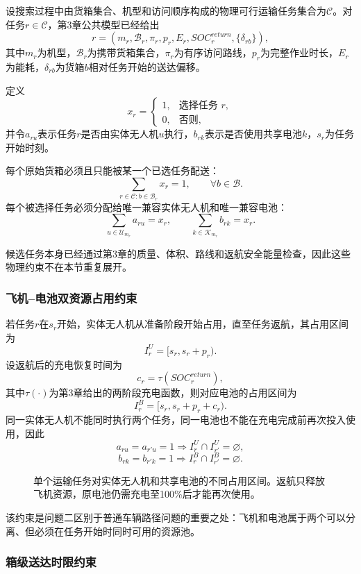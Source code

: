 \documentclass[UTF8,a4paper,12pt]{ctexart}
\begin{document}
设搜索过程中由货箱集合、机型和访问顺序构成的物理可行运输任务集合为$\mathcal C$。对任务$r\in\mathcal C$，第3章公共模型已经给出
\[
r=(m_r,\mathcal B_r,\pi_r,p_r,E_r,SOC_r^{return},\{\delta_{rb}\}),
\]
其中$m_r$为机型，$\mathcal B_r$为携带货箱集合，$\pi_r$为有序访问路线，$p_r$为完整作业时长，$E_r$为能耗，$\delta_{rb}$为货箱$b$相对任务开始的送达偏移。

定义
\[
x_r=
\begin{cases}
1,&\text{选择任务 }r,\\
0,&\text{否则},
\end{cases}
\]
并令$a_{ru}$表示任务$r$是否由实体无人机$u$执行，$b_{rk}$表示是否使用共享电池$k$，$s_r$为任务开始时刻。

每个原始货箱必须且只能被某一个已选任务配送：
\[
\boxed{
\sum_{r\in\mathcal C:b\in\mathcal B_r}x_r=1,
\qquad \forall b\in\mathcal B.
}
\]
每个被选择任务必须分配给唯一兼容实体无人机和唯一兼容电池：
\[
\sum_{u\in\mathcal U_{m_r}}a_{ru}=x_r,
\qquad
\sum_{k\in\mathcal K_{m_r}}b_{rk}=x_r.
\]

候选任务本身已经通过第3章的质量、体积、路线和返航安全能量检查，因此这些物理约束不在本节重复展开。

\subsubsection{飞机--电池双资源占用约束}

若任务$r$在$s_r$开始，实体无人机从准备阶段开始占用，直至任务返航，其占用区间为
\[
I_r^U=[s_r,s_r+p_r).
\]
设返航后的充电恢复时间为
\[
c_r=\tau(SOC_r^{return}),
\]
其中$\tau(\cdot)$为第3章给出的两阶段充电函数，则对应电池的占用区间为
\[
I_r^B=[s_r,s_r+p_r+c_r).
\]
同一实体无人机不能同时执行两个任务，同一电池也不能在充电完成前再次投入使用，因此
\[
a_{ru}=a_{r'u}=1
\Longrightarrow
I_r^U\cap I_{r'}^U=\varnothing,
\]
\[
b_{rk}=b_{r'k}=1
\Longrightarrow
I_r^B\cap I_{r'}^B=\varnothing.
\]

\begin{figure}[H]
  \centering
  \resizebox{0.86\textwidth}{!}{\QTwoFigOccupancy}
  \caption{单个运输任务对实体无人机和共享电池的不同占用区间。返航只释放飞机资源，原电池仍需充电至100\%后才能再次使用。}
  \label{fig:q2_resource_occupancy_v7}
\end{figure}

该约束是问题二区别于普通车辆路径问题的重要之处：飞机和电池属于两个可以分离、但必须在任务开始时同时可用的资源池。

\subsubsection{箱级送达时限约束}
\end{document}
